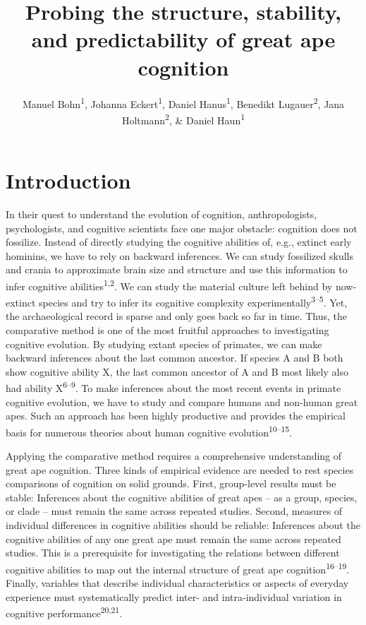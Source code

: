 \documentclass[
  man,floatsintext]{apa6}
\title{Probing the structure, stability, and predictability of great ape cognition}
\author{Manuel Bohn\textsuperscript{1}, Johanna Eckert\textsuperscript{1}, Daniel Hanus\textsuperscript{1}, Benedikt Lugauer\textsuperscript{2}, Jana Holtmann\textsuperscript{2}, \& Daniel Haun\textsuperscript{1}}
\date{}
\affiliation{\vspace{0.5cm}\textsuperscript{1} Department of Comparative Cultural Psychology, Max Planck Institute for Evolutionary Anthropology, Leipzig, Germany\\\textsuperscript{2} Psychologische Hochschule Berlin, Berlin, Germany}
\begin{document}
\maketitle

\hypertarget{introduction}{%
\section{Introduction}\label{introduction}}

In their quest to understand the evolution of cognition, anthropologists, psychologists, and cognitive scientists face one major obstacle: cognition does not fossilize. Instead of directly studying the cognitive abilities of, e.g., extinct early hominins, we have to rely on backward inferences. We can study fossilized skulls and crania to approximate brain size and structure and use this information to infer cognitive abilities\textsuperscript{1,2}. We can study the material culture left behind by now-extinct species and try to infer its cognitive complexity experimentally\textsuperscript{3--5}. Yet, the archaeological record is sparse and only goes back so far in time. Thus, the comparative method is one of the most fruitful approaches to investigating cognitive evolution. By studying extant species of primates, we can make backward inferences about the last common ancestor. If species A and B both show cognitive ability X, the last common ancestor of A and B most likely also had ability X\textsuperscript{6--9}. To make inferences about the most recent events in primate cognitive evolution, we have to study and compare humans and non-human great apes. Such an approach has been highly productive and provides the empirical basis for numerous theories about human cognitive evolution\textsuperscript{10--15}.

Applying the comparative method requires a comprehensive understanding of great ape cognition. Three kinds of empirical evidence are needed to rest species comparisons of cognition on solid grounds. First, group-level results must be stable: Inferences about the cognitive abilities of great apes -- as a group, species, or clade -- must remain the same across repeated studies. Second, measures of individual differences in cognitive abilities should be reliable: Inferences about the cognitive abilities of any one great ape must remain the same across repeated studies. This is a prerequisite for investigating the relations between different cognitive abilities to map out the internal structure of great ape cognition\textsuperscript{16--19}. Finally, variables that describe individual characteristics or aspects of everyday experience must systematically predict inter- and intra-individual variation in cognitive performance\textsuperscript{20,21}.
\end{document}
